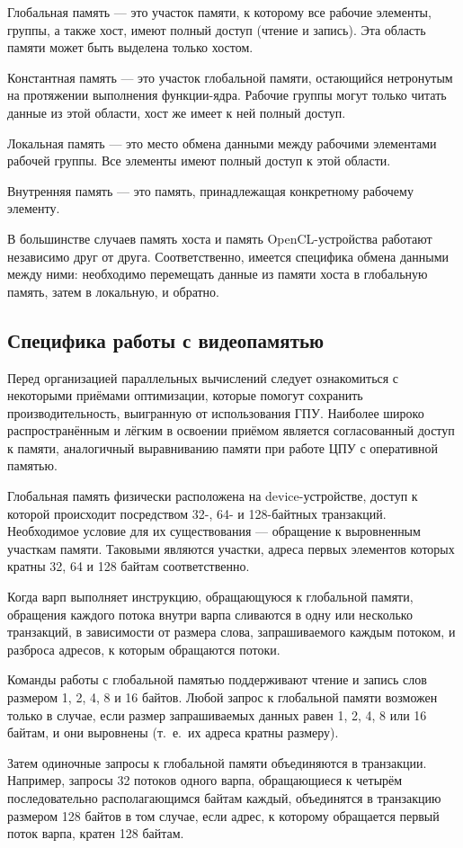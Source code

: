 Глобальная память --- это участок памяти, к которому все рабочие элементы, группы, а также хост, имеют полный доступ (чтение и запись). Эта область
памяти может быть выделена только хостом.

Константная память --- это участок глобальной памяти, остающийся нетронутым на протяжении выполнения функции-ядра. Рабочие группы могут только читать данные из этой области, хост же имеет к ней полный доступ.

Локальная память --- это место обмена данными между рабочими элементами рабочей группы. Все элементы имеют полный доступ к этой области.

Внутренняя память --- это память, принадлежащая конкретному рабочему
элементу.

В большинстве случаев память хоста и память OpenCL-устройства работают независимо друг от друга. Соответственно, имеется специфика обмена данными между ними: необходимо перемещать данные из памяти хоста в глобальную память, затем в локальную, и обратно.

\subsection{Специфика работы с видеопамятью}

Перед организацией параллельных вычислений следует ознакомиться с некоторыми приёмами оптимизации, которые помогут сохранить производительность, выигранную от использования ГПУ. Наиболее широко распространённым и лёгким в освоении приёмом является согласованный доступ к памяти, аналогичный выравниванию памяти при работе ЦПУ с оперативной памятью.

Глобальная память физически расположена на device-устройстве, доступ к
которой происходит посредством 32-, 64- и 128-байтных транзакций. Необходимое условие для их существования --- обращение к выровненным участкам
памяти. Таковыми являются участки, адреса первых элементов которых кратны
32, 64 и 128 байтам соответственно.

Когда варп выполняет инструкцию, обращающуюся к глобальной памяти,
обращения каждого потока внутри варпа сливаются в одну или несколько транзакций, в зависимости от размера слова, запрашиваемого каждым потоком, и
разброса адресов, к которым обращаются потоки.

Команды работы с глобальной памятью поддерживают чтение и запись
слов размером 1, 2, 4, 8 и 16 байтов. Любой запрос к глобальной памяти возможен только в случае, если размер запрашиваемых данных равен 1, 2, 4, 8 или 16
байтам, и они выровнены (т.~е.~их адреса кратны размеру).

Затем одиночные запросы к глобальной памяти объединяются в транзакции. Например, запросы 32 потоков одного варпа, обращающиеся к четырём последовательно располагающимся байтам каждый, объединятся в транзакцию размером 128 байтов в том случае, если адрес, к которому обращается первый поток варпа, кратен 128 байтам.

\clearpage